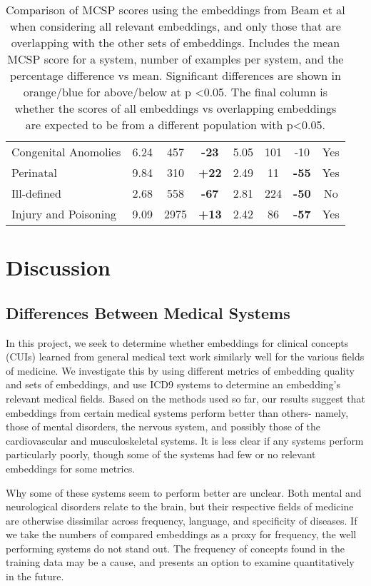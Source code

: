 \documentclass[10pt]{article}
\def\blu#1{{\textbf{\color{blu}#1}}}
\def\ora#1{{\textbf{\color{ora}#1}}}
\begin{document}
\begin{table*}[h]
\begin{tabular}{l|c|c|c|c|c|c|c}
		Congenital Anomolies & 6.24  & 457      & \blu{-23}       & 5.05 & 101      & -10             & Yes        \\
		Perinatal            & 9.84  & 310      & \ora{+22}        & 2.49 & 11       & \blu{-55}       & Yes        \\
		Ill-defined          & 2.68  & 558      & \blu{-67}       & 2.81 & 224      & \blu{-50}       & No         \\
		Injury and Poisoning & 9.09  & 2975     & \ora{+13}        & 2.42 & 86       & \blu{-57}       & Yes             
	\end{tabular}
\caption{Comparison of MCSP scores using the embeddings from Beam et al when considering all relevant embeddings, and only those that are overlapping with the other sets of embeddings. Includes the mean MCSP score for a system, number of examples per system, and the percentage difference vs mean. Significant differences are shown in orange/blue for above/below at p \textless 0.05. The final column is whether the scores of all embeddings vs overlapping embeddings are expected to be from a different population with p\textless 0.05.}
\end{table*}

\section{Discussion}

\subsection{Differences Between Medical Systems}
In this project, we seek to determine whether embeddings for clinical concepts (CUIs) learned from general medical text work similarly well for the various fields of medicine. We investigate this by using different metrics of embedding quality and sets of embeddings, and use ICD9 systems to determine an embedding's relevant medical fields. Based on the methods used so far, our results suggest that embeddings from certain medical systems perform better than others- namely, those of mental disorders, the nervous system, and possibly those of the cardiovascular and musculoskeletal systems. It is less clear if any systems perform particularly poorly, though some of the systems had few or no relevant embeddings for some metrics. 

Why some of these systems seem to perform better are unclear. Both mental and neurological disorders relate to the brain, but their respective fields of medicine are otherwise dissimilar across frequency, language, and specificity of diseases.  If we take the numbers of compared embeddings as a proxy for frequency, the well performing systems do not stand out. The frequency of concepts found in the training data may be a cause, and presents an option to examine quantitatively in the future. 
\end{document}
